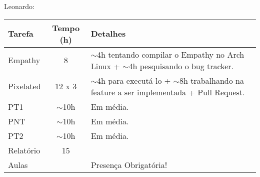 Leonardo:
\begin{center}
    \begin{tabular}{ | l | c | p{7cm} |}
    \hline
    Tarefa & Tempo (h) & Detalhes \\ \hline
    Empathy & 8 & $\sim$4h tentando compilar o Empathy no Arch Linux + $\sim$4h pesquisando o bug tracker. \\ \hline
    Pixelated & 12 x 3 & $\sim$4h para executá-lo + $\sim$8h trabalhando na feature a ser implementada + Pull Request. \\ \hline
    PT1 & $\sim$10h & Em média. \\ \hline
    PNT & $\sim$10h & Em média. \\ \hline
    PT2 & $\sim$10h & Em média. \\ \hline
    Relatório & 15 &  \\ \hline
    Aulas & & Presença Obrigatória! \\ \hline
    \end{tabular}
\end{center}
